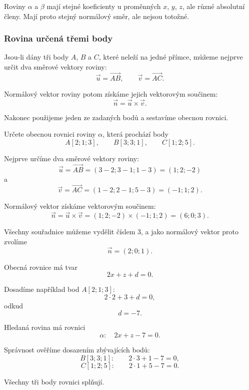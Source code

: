 Roviny $\alpha$ a $\beta$ mají stejné koeficienty u proměnných
$x$, $y$, $z$, ale různé absolutní členy. Mají proto stejný normálový
směr, ale nejsou totožné.


\subsubsection{Rovina určená třemi body}
\label{subsubsec:General_plane_three_points}

Jsou-li dány tři body $A$, $B$ a $C$, které neleží na jedné přímce,
můžeme nejprve určit dva směrové vektory roviny:
\[
    \vec{u}=\overrightarrow{AB},
    \qquad
    \vec{v}=\overrightarrow{AC}.
\]

Normálový vektor roviny potom získáme jejich vektorovým součinem:
\[
    \vec{n}=\vec{u}\times\vec{v}.
\]

Nakonec použijeme jeden ze zadaných bodů a sestavíme obecnou rovnici.

\begin{example}
    \label{exa:General_plane_three_points}

    Určete obecnou rovnici roviny $\alpha$, která prochází body
    \[
        A[2;1;3],
        \qquad
        B[3;3;1],
        \qquad
        C[1;2;5].
    \]

    Nejprve určíme dva směrové vektory roviny:
    \[
        \vec{u}
        =
        \overrightarrow{AB}
        =
        (3-2;3-1;1-3)
        =
        (1;2;-2)
    \]
    a
    \[
        \vec{v}
        =
        \overrightarrow{AC}
        =
        (1-2;2-1;5-3)
        =
        (-1;1;2).
    \]

    Normálový vektor získáme vektorovým součinem:
    \[
        \vec{n}
        =
        \vec{u}\times\vec{v}
        =
        (1;2;-2)\times(-1;1;2)
        =
        (6;0;3).
    \]

    Všechny souřadnice můžeme vydělit číslem $3$, a jako normálový
    vektor proto zvolíme
    \[
        \vec{n}=(2;0;1).
    \]

    Obecná rovnice má tvar
    \[
        2x+z+d=0.
    \]

    Dosadíme například bod $A[2;1;3]$:
    \[
        2\cdot2+3+d=0,
    \]
    odkud
    \[
        d=-7.
    \]

    Hledaná rovina má rovnici
    \[
        \alpha:\quad 2x+z-7=0.
    \]

    Správnost ověříme dosazením zbývajících bodů:
    \[
        B[3;3;1]:
        \qquad
        2\cdot3+1-7=0,
    \]
    \[
        C[1;2;5]:
        \qquad
        2\cdot1+5-7=0.
    \]

    Všechny tři body rovnici splňují.
\end{example}

